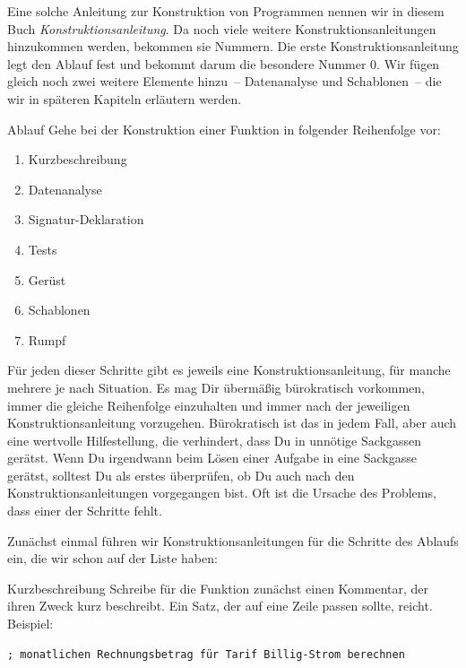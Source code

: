Eine solche Anleitung zur Konstruktion von Programmen nennen wir in
diesem Buch
\textit{Konstruktionsanleitung}.  Da
noch viele weitere Konstruktionsanleitungen hinzukommen werden,
bekommen sie Nummern.  Die erste Konstruktionsanleitung legt den
Ablauf fest und bekommt darum die besondere Nummer 0.
Wir fügen gleich noch zwei weitere Elemente
hinzu~-- Datenanalyse und Schablonen~-- die wir in späteren Kapiteln
erläutern werden.

\setcounter{xkonstruktionsanleitung}{-1}

\begin{konstruktionsanleitung}{Ablauf}
  Gehe bei der Konstruktion einer Funktion in folgender Reihenfolge
  vor:
  \begin{enumerate}
    \item Kurzbeschreibung
    \item Datenanalyse
    \item Signatur-Deklaration
    \item Tests
    \item Gerüst
    \item Schablonen
    \item Rumpf
    \end{enumerate}
\end{konstruktionsanleitung}
%
Für jeden dieser Schritte gibt es jeweils eine Konstruktionsanleitung,
für manche mehrere je nach Situation.
Es mag Dir übermäßig
bürokratisch vorkommen, immer die gleiche Reihenfolge einzuhalten und
immer nach der jeweiligen Konstruktionsanleitung vorzugehen.
Bürokratisch ist das in jedem Fall, aber auch eine wertvolle
Hilfestellung, die verhindert, dass Du in unnötige Sackgassen
gerätst.  Wenn Du irgendwann beim Lösen einer Aufgabe in
eine Sackgasse gerätst, solltest Du als erstes überprüfen, ob Du auch
nach den Konstruktionsanleitungen vorgegangen bist.  Oft ist die
Ursache des Problems, dass einer der Schritte fehlt.

Zunächst einmal führen wir Konstruktionsanleitungen für die Schritte
des Ablaufs ein, die wir schon auf der Liste haben:

\begin{konstruktionsanleitung}{Kurzbeschreibung}
  \label{ka:kurzbeschreibung}
  Schreibe für die Funktion zunächst einen Kommentar, der ihren Zweck
  kurz beschreibt.  Ein Satz, der auf eine Zeile passen sollte,
  reicht.  Beispiel:
\begin{lstlisting}
; monatlichen Rechnungsbetrag für Tarif Billig-Strom berechnen
\end{lstlisting}
\end{konstruktionsanleitung}

